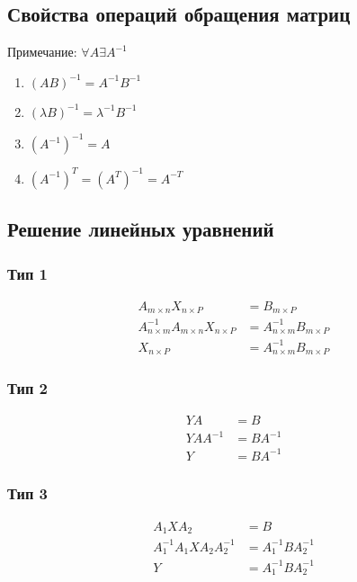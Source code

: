 \documentclass{article}
\begin{document}
\subsection{Свойства операций обращения матриц}

Примечание: $\forall A \exists A^{-1}$

\begin{enumerate}
	\item $(AB)^{-1} = A^{-1} B^{-1}$
	\item $(\lambda B)^{-1} = \lambda^{-1} B^{-1}$
	\item $(A^{-1})^{-1} = A$
	\item $(A^{-1})^T = (A^T)^{-1} = A^{-T}$
\end{enumerate}

\subsection{Решение линейных уравнений}

\subsubsection*{Тип 1}

\begin{align*}
A_{m \times n} X_{n \times P} &= B_{m \times P}\\
A_{n \times m}^{-1} A_{m \times n} X_{n \times P} &= A_{n \times m}^{-1} B_{m \times P}\\
X_{n \times P} &= A_{n \times m}^{-1} B_{m \times P}
\end{align*}

\subsubsection*{Тип 2}

\begin{align*}
Y A &= B \\
Y A A^{-1} &= B A^{-1} \\
Y &= B A^{-1}
\end{align*}

\subsubsection*{Тип 3}

\begin{align*}
	A_1 X A_2 &= B \\
	A_1^{-1} A_1 X A_2 A_2^{-1} &= A_1^{-1} B A_2^{-1} \\
	Y &= A_1^{-1} B A_2^{-1}
\end{align*}	
\end{document}
